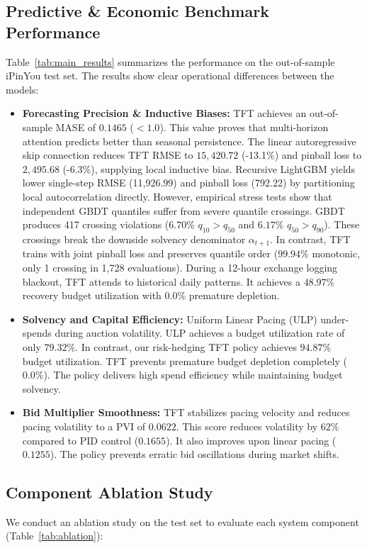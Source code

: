 \documentclass[sigconf]{acmart}
\begin{document}
\subsection{Predictive \& Economic Benchmark Performance}
Table~\ref{tab:main_results} summarizes the performance on the out-of-sample iPinYou test set. The results show clear operational differences between the models:
\begin{itemize}
    \item \textbf{Forecasting Precision \& Inductive Biases:} TFT achieves an out-of-sample MASE of $0.1465$ ($< 1.0$). This value proves that multi-horizon attention predicts better than seasonal persistence. The linear autoregressive skip connection reduces TFT RMSE to $15,420.72$ (-13.1\%) and pinball loss to $2,495.68$ (-6.3\%), supplying local inductive bias. Recursive LightGBM yields lower single-step RMSE (11,926.99) and pinball loss (792.22) by partitioning local autocorrelation directly. However, empirical stress tests show that independent GBDT quantiles suffer from severe quantile crossings. GBDT produces 417 crossing violations ($6.70\%$ $q_{10} > q_{50}$ and $6.17\%$ $q_{50} > q_{90}$). These crossings break the downside solvency denominator $\alpha_{t+1}$. In contrast, TFT trains with joint pinball loss and preserves quantile order ($99.94\%$ monotonic, only 1 crossing in 1,728 evaluations). During a 12-hour exchange logging blackout, TFT attends to historical daily patterns. It achieves a $48.97\%$ recovery budget utilization with $0.0\%$ premature depletion.
    \item \textbf{Solvency and Capital Efficiency:} Uniform Linear Pacing (ULP) under-spends during auction volatility. ULP achieves a budget utilization rate of only $79.32\%$. In contrast, our risk-hedging TFT policy achieves $94.87\%$ budget utilization. TFT prevents premature budget depletion completely ($0.0\%$). The policy delivers high spend efficiency while maintaining budget solvency.
    \item \textbf{Bid Multiplier Smoothness:} TFT stabilizes pacing velocity and reduces pacing volatility to a PVI of $0.0622$. This score reduces volatility by $62\%$ compared to PID control ($0.1655$). It also improves upon linear pacing ($0.1255$). The policy prevents erratic bid oscillations during market shifts.
\end{itemize}

\subsection{Component Ablation Study}
We conduct an ablation study on the test set to evaluate each system component (Table~\ref{tab:ablation}):
\end{document}
